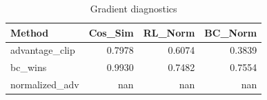 \begin{table}[htbp]
\centering
\caption{Gradient diagnostics}
\label{tab:grad-diag}
\begin{tabular}{lrrr}
\toprule
\textbf{Method} & \textbf{Cos\_Sim} & \textbf{RL\_Norm} & \textbf{BC\_Norm} \\
\midrule
advantage\_clip & 0.7978 & 0.6074 & 0.3839 \\
bc\_wins & 0.9930 & 0.7482 & 0.7554 \\
normalized\_adv & nan & nan & nan \\
\bottomrule
\end{tabular}
\end{table}